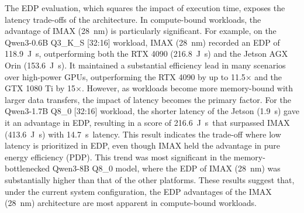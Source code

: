 The EDP evaluation, which squares the impact of execution time, exposes the latency trade-offs of the architecture. 
In compute-bound workloads, the advantage of IMAX (\SI{28}{\nano\meter}) is particularly significant.
For example, on the Qwen3-0.6B Q3\_K\_S [32:16] workload, IMAX (\SI{28}{\nano\meter}) recorded an EDP of \SI{118.9}{\joule\second}, outperforming both the RTX 4090 (\SI{216.8}{\joule\second}) and the Jetson AGX Orin (\SI{153.6}{\joule\second}). 
It maintained a substantial efficiency lead in many scenarios over high-power GPUs, outperforming the RTX 4090 by up to \num{11.5}$\times$ and the GTX 1080 Ti by \num{15}$\times$.
However, as workloads become more memory-bound with larger data transfers, the impact of latency becomes the primary factor.
For the Qwen3-1.7B Q8\_0 [32:16] workload, the shorter latency of the Jetson (\SI{1.9}{\second}) gave it an advantage in EDP, resulting in a score of \SI{216.6}{\joule\second}\, that surpassed IMAX (\SI{413.6}{\joule\second}) with \SI{14.7}{\second}\ latency.
This result indicates the trade-off where low latency is prioritized in EDP, even though IMAX held the advantage in pure energy efficiency (PDP). 
This trend was most significant in the memory-bottlenecked Qwen3-8B Q8\_0 model, where the EDP of IMAX (\SI{28}{\nano\meter}) was substantially higher than that of the other platforms. 
These results suggest that, under the current system configuration, the EDP advantages of the IMAX (\SI{28}{\nano\meter}) architecture are most apparent in compute-bound workloads.

